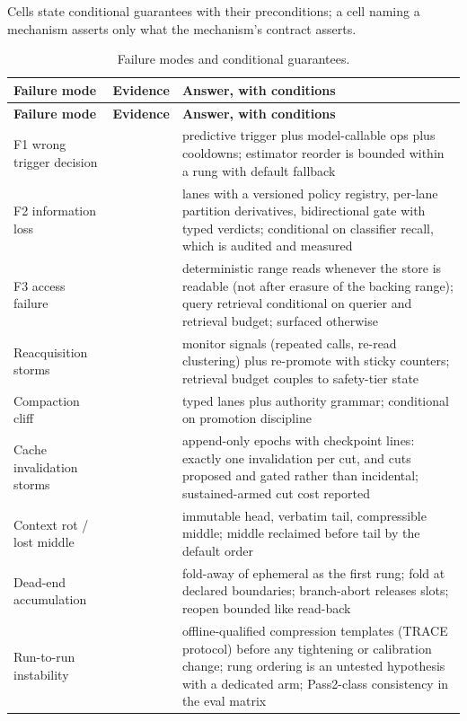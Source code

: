 \documentclass[11pt]{article}
\begin{document}
Cells state conditional guarantees with their preconditions; a cell naming a mechanism asserts only what the mechanism's contract asserts.

{\footnotesize
\begin{longtable}{@{}p{3.4cm}p{3.9cm}p{7.2cm}@{}}
\caption{Failure modes and conditional guarantees.}\label{tab:failures}\\
\toprule
\textbf{Failure mode} & \textbf{Evidence} & \textbf{Answer, with conditions} \\
\midrule
\endfirsthead
\toprule
\textbf{Failure mode} & \textbf{Evidence} & \textbf{Answer, with conditions} \\
\midrule
\endhead
F1 wrong trigger decision & \cite{acm2026,survey2026compress} & predictive trigger plus model-callable ops plus cooldowns; estimator reorder is bounded within a rung with default fallback \\
F2 information loss & \cite{cliff2026,lifecycle2026} & lanes with a versioned policy registry, per-lane partition derivatives, bidirectional gate with typed verdicts; conditional on classifier recall, which is audited and measured \\
F3 access failure & \cite{interact2026} & deterministic range reads whenever the store is readable (not after erasure of the backing range); query retrieval conditional on querier and retrieval budget; surfaced otherwise \\
Reacquisition storms & \cite{interact2026,adacom2026} & monitor signals (repeated calls, re-read clustering) plus re-promote with sticky counters; retrieval budget couples to safety-tier state \\
Compaction cliff & \cite{cliff2026} & typed lanes plus authority grammar; conditional on promotion discipline \\
Cache invalidation storms & \cite{anthropic2026docs,dream2026} & append-only epochs with checkpoint lines: exactly one invalidation per cut, and cuts proposed and gated rather than incidental; sustained-armed cut cost reported \\
Context rot / lost middle & \cite{lost2024} & immutable head, verbatim tail, compressible middle; middle reclaimed before tail by the default order \\
Dead-end accumulation & \cite{agentfold2026} & fold-away of ephemeral as the first rung; fold at declared boundaries; branch-abort releases slots; reopen bounded like read-back \\
Run-to-run instability & \cite{trace2026} & offline-qualified compression templates (TRACE protocol) before any tightening or calibration change; rung ordering is an untested hypothesis with a dedicated arm; Pass2-class consistency in the eval matrix \\

\end{longtable}}
\end{document}
